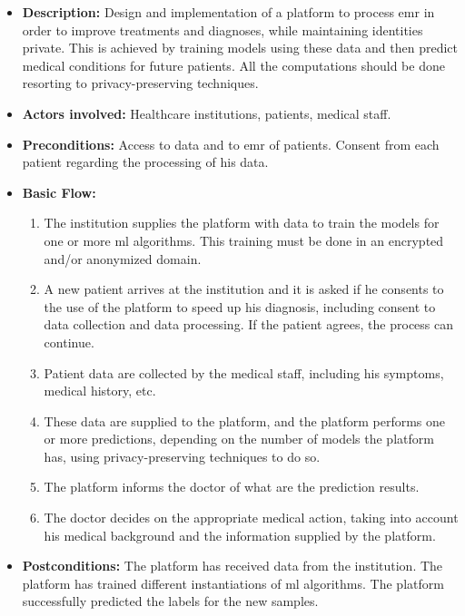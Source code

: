 \begin{itemize}
	

	\item \textbf{Description:} Design and implementation of a platform to process \ac{emr} in order to improve treatments and diagnoses, while maintaining identities private. This is achieved by training models using these data and then predict medical conditions for future patients. All the computations should be done resorting to privacy-preserving techniques.

	\item \textbf{Actors involved:} Healthcare institutions, patients, medical staff.

	\item \textbf{Preconditions:} Access to data and to \ac{emr} of patients. Consent from each patient regarding the processing of his data.

	\item \textbf{Basic Flow:} 
	
	\begin{enumerate}
		\item The institution supplies the platform with data to train the models for one or more \ac{ml} algorithms. This training must be done in an encrypted and/or anonymized domain.

		\item A new patient arrives at the institution and it is asked if he consents to the use of the platform to speed up his diagnosis, including consent to data collection and data processing. If the patient agrees, the process can continue.

		\item Patient data are collected by the medical staff, including his symptoms, medical history, etc.

		\item These data are supplied to the platform, and the platform performs one or more predictions, depending on the number of models the platform has, using privacy-preserving techniques to do so.

		\item The platform informs the doctor of what are the prediction results.

		\item The doctor decides on the appropriate medical action, taking into account his medical background and the information supplied by the platform.


	\end{enumerate}

	\item \textbf{Postconditions:} The platform has received data from the institution. The platform has trained different instantiations of \ac{ml} algorithms. The platform successfully predicted the labels for the new samples.

\end{itemize}





